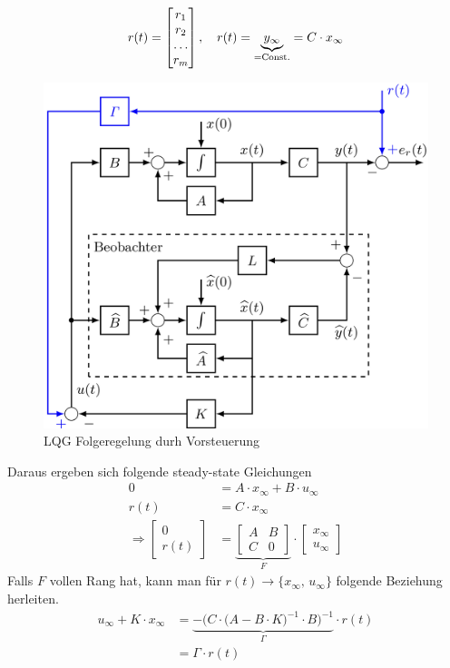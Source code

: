         \begin{equation*}
            r(t) = \begin{bmatrix}r_1\\r_2\\\hdots\\r_m\end{bmatrix},\quad
            r(t) = \underbrace{y_\infty}_{= \textnormal{Const.}} = C\cdot x_\infty
        \end{equation*}
        \begin{figure}[H]
            \centering
            \includegraphics[width = 0.6\linewidth]{images/10/LQG_Folg_Vorst.jpeg}
            \caption{LQG Folgeregelung durh Vorsteuerung}
        \end{figure}
        Daraus ergeben sich folgende steady-state Gleichungen
        \begin{align*}
            0 &= A\cdot x_\infty + B\cdot u_\infty\\
            r(t) &= C\cdot x_\infty\\
            \Rightarrow \begin{bmatrix}0\\r(t)\end{bmatrix} &= 
            \underbrace{\begin{bmatrix}
            A & B\\
            C & 0
            \end{bmatrix}}_{F} \cdot
            \begin{bmatrix}x_\infty\\u_\infty\end{bmatrix}
        \end{align*}
        Falls $F$ vollen Rang hat, kann man für $r(t)\rightarrow\{x_\infty,\, u_\infty\}$ folgende Beziehung herleiten.
        \begin{align*}
            u_\infty + K\cdot x_\infty &= \underbrace{-\Big(C\cdot\big(A-B\cdot K\big)^{-1}\cdot B\Big)^{-1}}_{\mathit{\Gamma}} \cdot r(t)\\
            &= \mathit{\Gamma}\cdot r(t)
        \end{align*}